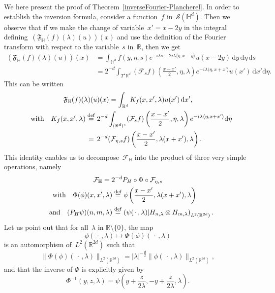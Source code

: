 \documentclass[11pt]{article}
\theoremstyle{definition}
\numberwithin{equation}{section}
\numberwithin{figure}{section}
\numberwithin{table}{section}
\newcommand{\lam}{\lambda}
\newcommand*\cF{\mathcal{F}}
\newcommand*\cS{\mathcal{S}}
\newcommand*\fF{\mathfrak{F}}
\newcommand*\R{\mathbb{R}}
\newcommand*\bbH{\mathbb{H}}
\newcommand{\andf}{\quad\hbox{and}\quad}
\newcommand{\with}{\quad\hbox{with}\quad}
\newcommand*\eqdefa{\overset{\mathrm{def}}{=}}
\newcommand*\peqdefa{\overset{\phantom{\mathrm{def}}}{=}}
\newcommand*{\dd}{\mathrm{d}}
\newcommand{\ds}{\dd s}
\newcommand{\dx}{\dd x}
\newcommand{\dy}{\dd y}
\newcommand{\deta}{\dd \eta}
\renewcommand*{\cdotp}{.}
\begin{document}
We here present the proof of Theorem~\ref{inverseFourier-Plancherel}. In order to establish the inversion formula, consider a function~$f$ in~$\cS(\bbH^d)$. Then we observe that if we make the change of variable~$x'= x-2y$ in the integral defining~$(\fF_{\bbH}(f)(\lam)(u))(x)$ and use the definition of the Fourier transform with respect to the variable~$s$ in~$\R$, then we get
\begin{equation}
\begin{aligned}\label{formulaFourerHbis-1}
\left(\fF_{\bbH}(f)(\lam)(u)\right)(x) &=
\int_{\bbH^d} f(y,\eta,s) e^{-i\lam s -2i\lam \langle \eta, x-y\rangle} u(x-2y)\,\dy\,\deta\, \ds\\
&= 2^{-d}\int_{T^\star \R^d} (\cF_s f)\left(\frac {x-x'} 2,\eta, \lam\right) e^{-i\lam \langle \eta, x+x'\rangle} u(x') \,\dx'\deta.
\end{aligned}
\end{equation}
This can be written
\begin{equation}\label{formulaFourerHbis}
\begin{gathered}
\fF_{\bbH}(f)(\lam) (u)(x) = \int_{\R^d} K_f(x,x',\lam) u(x')\, \dx',\\
\begin{aligned}
\with K_f(x,x',\lam) &\eqdefa 2^{-d} \int_{(\R^d)^\star } (\cF_s f)\left(\frac {x-x'} 2,\eta, \lam\right) e^{-i\lam \langle \eta, x+x'\rangle} \deta\\
&\peqdefa 2^{-d} (\cF_{\eta,s} f)\left(\frac {x-x'} 2,\lam(x+x'), \lam\right).
\end{aligned}
\end{gathered}
\end{equation}
This identity enables us to decompose~$\cF_\bbH$ into the product of three very simple operations, namely
\begin{equation}\label{decomF_H}
\begin{gathered}
\cF_\bbH = 2^{-d}P_H \circ \Phi\circ \cF_{\eta,s}\\
\begin{aligned}
\with \Phi(\phi)(x,x',\lam) & \eqdefa \phi \left(\frac {x-x'} 2,\lam(x+x'), \lam\right)\\
\andf (P_H\psi)(n,m,\lam) & \eqdefa \left(\psi({\,\cdot\,},\lam)| H_{n,\lam} \otimes H_{m,\lam}\right)_{L^2(\R^{2d})}.
\end{aligned}
\end{gathered}
\end{equation}
Let us point out that for all~$\lam$ in $\R\setminus\{0\}$, the map
\[
\phi({\,\cdot\,},\lam) \longmapsto \Phi(\phi)({\,\cdot\,}, \lam)
\]
is an automorphism of~$L^2(\R^{2d})$ such that
\begin{equation}\label{inverseFourierL2demoeq1}
\|\Phi(\phi) ({\,\cdot\,},\lam)\|_{L^2(\R^{2d})} =|\lam|^{- \frac d 2} \|\phi({\,\cdot\,},\lam)\|_{L^2(\R^{2d})},
\end{equation}
and that the inverse of $\Phi$ is explicitly given by
\begin{equation}\label{inverseFourierL2demoeq2}
\Phi^{-1} (y,z,\lam)= \psi \left (y+\frac z {2\lam}, -y+\frac z {2\lam}, \lam \right)\cdotp
\end{equation}
\end{document}
